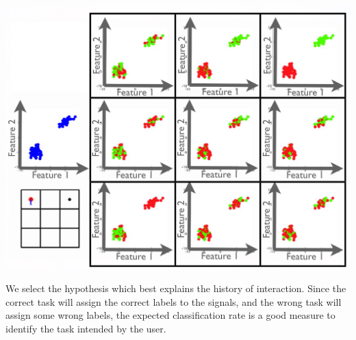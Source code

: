 \documentclass[a0,final, portrait]{inriaposter}
\begin{document}
\begin{multicols}{2}
{\begin{center}
\begin{minipage}{.02\columnwidth}
\begin{center}
	\end{center}
\end{minipage}
\begin{minipage}{.442\columnwidth}
	\begin{center}
		\includegraphics[width=\columnwidth]{images/toy_sol.png}
	\end{center}
\end{minipage}
\end{center}

We select the hypothesis which best explains the history of interaction. Since the correct task will assign the correct labels to the signals, and the wrong task will assign some wrong labels, the expected classification rate is a good measure to identify the task intended by the user.

}

\end{multicols}
\end{document}
